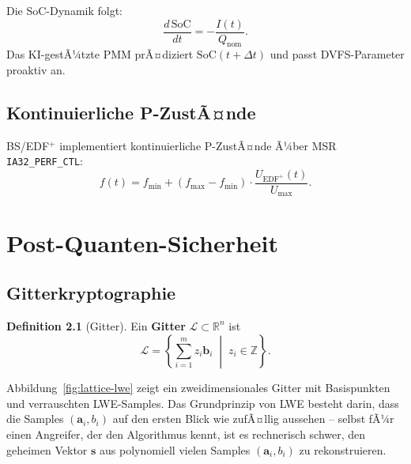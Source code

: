 ﻿\documentclass[a4paper,12pt]{scrreprt}
\theoremstyle{definition}
\newtheorem{definition}{Definition}[chapter]
\begin{document}
	Die SoC-Dynamik folgt:
	\[
	\frac{d\,\mathrm{SoC}}{dt} = -\frac{I(t)}{Q_{\mathrm{nom}}}.
	\]
	Das KI-gestÃ¼tzte PMM \cite{Epp2026liionp} prÃ¤diziert $\mathrm{SoC}(t + \Delta t)$
	und passt DVFS-Parameter proaktiv an.
	
	\section{Kontinuierliche P-ZustÃ¤nde}
	
	BS/EDF$^+$ implementiert kontinuierliche P-ZustÃ¤nde Ã¼ber MSR \texttt{IA32\_PERF\_CTL}:
	\[
	f(t) = f_{\min} + (f_{\max} - f_{\min}) \cdot \frac{U_{\mathrm{EDF}^+}(t)}{U_{\max}}.
	\]
	
	\chapter{Post-Quanten-Sicherheit}
	
	\section{Gitterkryptographie}

	\begin{definition}[Gitter]
		Ein \textbf{Gitter} $\mathcal{L} \subset \mathbb{R}^n$ ist
		\[
		\mathcal{L} = \left\{\sum_{i=1}^m z_i \mathbf{b}_i \;\middle|\; z_i \in \mathbb{Z}\right\}.
		\]
	\end{definition}

	Abbildung~\ref{fig:lattice-lwe} zeigt ein zweidimensionales Gitter mit
	Basispunkten und verrauschten LWE-Samples. Das Grundprinzip von LWE
	besteht darin, dass die Samples $(\mathbf{a}_i, b_i)$ auf den ersten
	Blick wie zufÃ¤llig aussehen -- selbst fÃ¼r einen Angreifer, der den
	Algorithmus kennt, ist es rechnerisch schwer, den geheimen Vektor
	$\mathbf{s}$ aus polynomiell vielen Samples $(\mathbf{a}_i, b_i)$ zu
	rekonstruieren.
\end{document}
